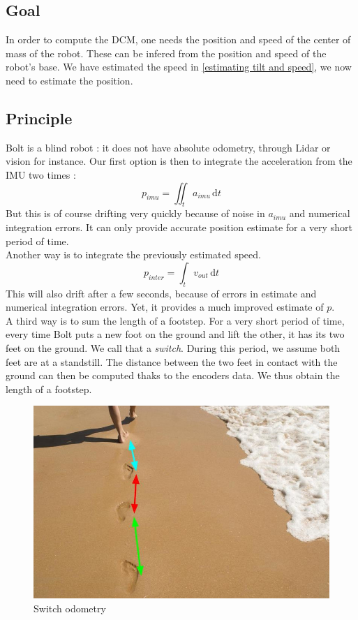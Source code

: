 \documentclass[a4paper,10pt]{article}
\begin{document}
\subsection{Goal}
In order to compute the DCM, one needs the position and speed of the center of mass of the robot. These can be infered from the position and speed of the robot's base. We have estimated the speed in \ref{estimating tilt and speed}, we now need to estimate the position.

\subsection{Principle}
Bolt is a blind robot : it does not have absolute odometry, through Lidar or vision for instance. Our first option is then to integrate the acceleration from the IMU two times :
$$ p_{imu} = \iint_t a_{imu} \, \mathrm{d}t $$
But this is of course drifting very quickly because of noise in $a_{imu}$ and numerical integration errors. It can only provide accurate position estimate for a very short period of time.\\
\newline
Another way is to integrate the previously estimated speed.
$$ p_{inter} = \int_t v_{out} \, \mathrm{d}t $$
This will also drift after a few seconds, because of errors in estimate and numerical integration errors. Yet, it provides a much improved estimate of $p$.\\
\newline
A third way is to sum the length of a footstep. For a very short period of time, every time Bolt puts a new foot on the ground and lift the other, it has its two feet on the ground. We call that a \textit{switch}. During this period, we assume both feet are at a standstill. The distance between the two feet in contact with the ground can then be computed thaks to the encoders data. We thus obtain the length of a footstep.

\begin{figure}[H]
\centering
  \includegraphics[width=\linewidth, angle=0, scale=0.6]{./images/footprint.jpg}
  \caption{Switch odometry}
\end{figure}
\end{document}
